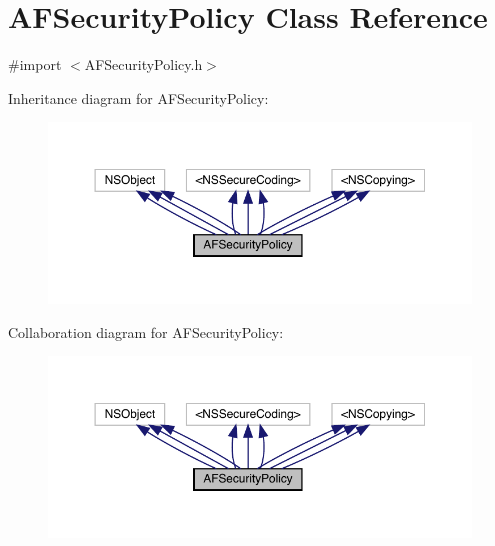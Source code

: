 \hypertarget{interface_a_f_security_policy}{}\section{A\+F\+Security\+Policy Class Reference}
\label{interface_a_f_security_policy}


{\ttfamily \#import $<$A\+F\+Security\+Policy.\+h$>$}



Inheritance diagram for A\+F\+Security\+Policy\+:\nopagebreak
\begin{figure}[H]
\begin{center}
\leavevmode
\includegraphics[width=350pt]{interface_a_f_security_policy__inherit__graph}
\end{center}
\end{figure}


Collaboration diagram for A\+F\+Security\+Policy\+:\nopagebreak
\begin{figure}[H]
\begin{center}
\leavevmode
\includegraphics[width=350pt]{interface_a_f_security_policy__coll__graph}
\end{center}
\end{figure}
